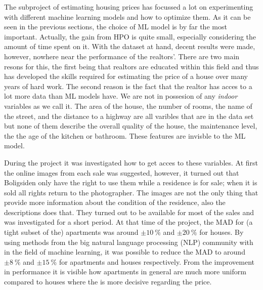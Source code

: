 The subproject of estimating housing prices has focussed a lot on experimenting with different machine learning models and how to optimize them. As it can be seen in the previous sections, the choice of ML model is by far the most important. Actually, the gain from HPO is quite small, especially considering the amount of time spent on it. With the dataset at hand, decent results were made, however, nowhere near the performance of the realtors'. There are two main resons for this, the first being that realtors are educated within this field and thus has developed the skills required for estimating the price of a house over many years of hard work. The second reason is the fact that the realtor has acces to a lot more data than ML models have. We are not in possesion of any \emph{indoor} variables as we call it. The area of the house, the number of rooms, the name of the street, and the distance to a highway are all varibles that are in the data set but none of them describe the overall quality of the house, the maintenance level, the the age of the kitchen or bathroom. These features are invisble to the ML model. 

During the project it was investigated how to get acces to these variables. At first the online images from each sale was suggested, however, it turned out that Boligsiden only have the right to use them while a residence is for sale; when it is sold all rights return to the photographer. The images are not the only thing that provide more information about the condition of the residence, also the descriptions does that. They turned out to be available for most of the sales and was investigated for a short period. At that time of the project, the MAD for (a tight subset of the) apartments was around $\pm \SI{10}{\percent}$ and $\pm \SI{20}{\percent}$ for houses. By using methods from the big natural language processing (NLP) community with in the field of machine learning, it was possible to reduce the MAD to around $\pm \SI{8}{\percent}$ and $\pm \SI{15}{\percent}$ for apartments and houses respectively. From the improvement in performance it is visible how apartments in general are much more uniform compared to houses where the  is more decisive regarding the price. 

